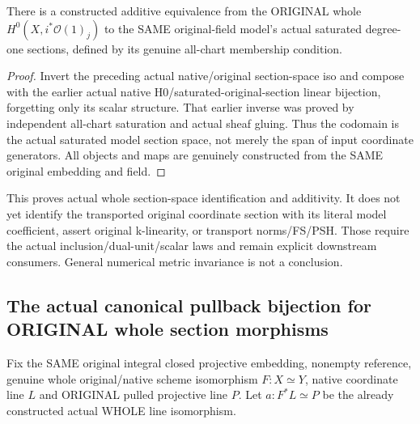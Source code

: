 \begin{definition}
\label{def:seven-original-coordinate-h0-saturated-model-sections-route}
\leanok
{}
There is a constructed additive equivalence from the ORIGINAL whole
$H^0(X,i^*\mathcal O(1)_j)$ to the SAME original-field model's actual
saturated degree-one sections, defined by its genuine all-chart membership
condition.
\end{definition}
\begin{proof}
Invert the preceding actual native/original section-space iso and compose
with the earlier actual native H0/saturated-original-section linear
bijection, forgetting only its scalar structure. That earlier inverse was
proved by independent all-chart saturation and actual sheaf gluing. Thus
the codomain is the actual saturated model section space, not merely the
span of input coordinate generators. All objects and maps are genuinely
constructed from the SAME original embedding and field.
\end{proof}

This proves actual whole section-space identification and additivity. It
does not yet identify the transported original coordinate section with
its literal model coefficient, assert original k-linearity, or transport
norms/FS/PSH. Those require the actual inclusion/dual-unit/scalar laws and
remain explicit downstream consumers. General numerical metric invariance
is not a conclusion.
\subsection{The actual canonical pullback bijection for ORIGINAL whole section morphisms}
Fix the SAME original integral closed projective embedding, nonempty
reference, genuine whole original/native scheme isomorphism $F:X\simeq Y$,
native coordinate line $L$ and ORIGINAL pulled projective line $P$. Let
$a:F^*L\simeq P$ be the already constructed actual WHOLE line isomorphism.


